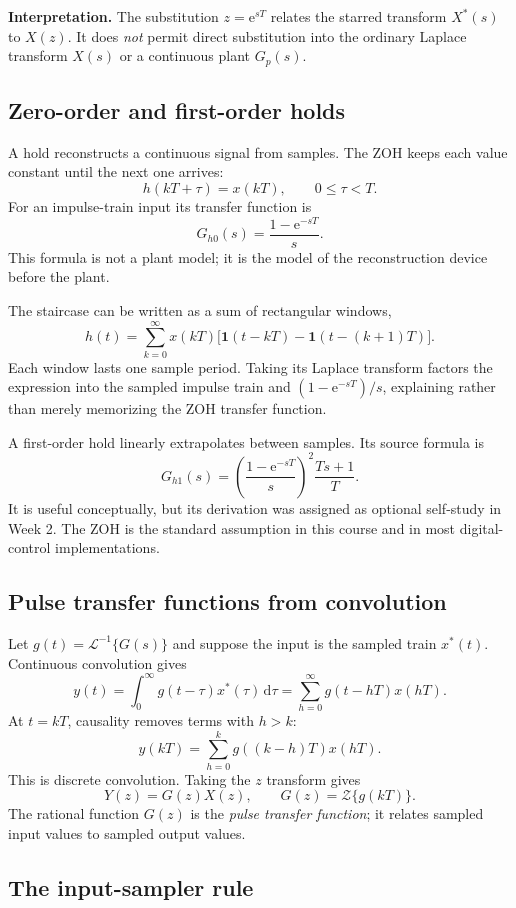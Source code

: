 \documentclass[11pt]{article}
\newcommand{\Z}{\mathcal{Z}}
\newcommand{\Lcal}{\mathcal{L}}
\newcommand{\dd}{\,\mathrm{d}}
\newcommand{\e}{\mathrm{e}}
\newcommand{\unitstep}{\mathbf{1}}
\newcommand{\weeklabel}[1]{\par\smallskip\noindent{\color{blue!60!black}\textbf{Taught in #1.}}\par\smallskip}
\begin{document}
\textbf{Interpretation.} The substitution $z=\e^{sT}$ relates the starred transform $X^*(s)$ to $X(z)$. It does \emph{not} permit direct substitution into the ordinary Laplace transform $X(s)$ or a continuous plant $G_p(s)$.

\subsection{Zero-order and first-order holds}

A hold reconstructs a continuous signal from samples. The ZOH keeps each value constant until the next one arrives:
\[
h(kT+\tau)=x(kT),\qquad 0\le \tau<T.
\]
For an impulse-train input its transfer function is
\[
G_{h0}(s)=\frac{1-\e^{-sT}}{s}.
\]
This formula is not a plant model; it is the model of the reconstruction device before the plant.

The staircase can be written as a sum of rectangular windows,
\[
h(t)=\sum_{k=0}^{\infty}x(kT)
\bigl[\unitstep(t-kT)-\unitstep(t-(k+1)T)\bigr].
\]
Each window lasts one sample period. Taking its Laplace transform factors the expression into the sampled impulse train and $(1-\e^{-sT})/s$, explaining rather than merely memorizing the ZOH transfer function.

A first-order hold linearly extrapolates between samples. Its source formula is
\[
G_{h1}(s)=\left(\frac{1-\e^{-sT}}{s}\right)^2\frac{Ts+1}{T}.
\]
It is useful conceptually, but its derivation was assigned as optional self-study in Week 2. The ZOH is the standard assumption in this course and in most digital-control implementations.

\subsection{Pulse transfer functions from convolution}

\weeklabel{Week 3 (beginning here)}

Let $g(t)=\Lcal^{-1}\{G(s)\}$ and suppose the input is the sampled train $x^*(t)$. Continuous convolution gives
\[
y(t)=\int_0^\infty g(t-\tau)x^*(\tau)\dd\tau
=\sum_{h=0}^{\infty}g(t-hT)x(hT).
\]
At $t=kT$, causality removes terms with $h>k$:
\[
y(kT)=\sum_{h=0}^{k}g((k-h)T)x(hT).
\]
This is discrete convolution. Taking the $z$ transform gives
\[
Y(z)=G(z)X(z),\qquad
G(z)=\Z\{g(kT)\}.
\]
The rational function $G(z)$ is the \emph{pulse transfer function}; it relates sampled input values to sampled output values.

\subsection{The input-sampler rule}
\end{document}
